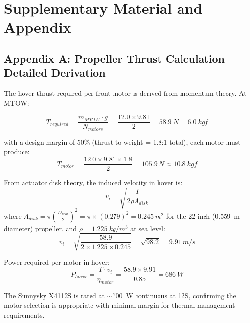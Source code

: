 \chapter{Supplementary Material and Appendix}

\section*{Appendix A: Propeller Thrust Calculation -- Detailed Derivation}

The hover thrust required per front motor is derived from momentum theory. At MTOW:

\begin{equation}
    T_{required} = \frac{m_{MTOW} \cdot g}{N_{motors}} = \frac{12.0 \times 9.81}{2} = \SI{58.9}{N} = \SI{6.0}{kgf}
\end{equation}

\noindent with a design margin of 50\% (thrust-to-weight = 1.8:1 total), each motor must produce:
\begin{equation}
    T_{motor} = \frac{12.0 \times 9.81 \times 1.8}{2} = \SI{105.9}{N} \approx \SI{10.8}{kgf}
\end{equation}

\noindent From actuator disk theory, the induced velocity in hover is:
\begin{equation}
    v_i = \sqrt{\frac{T}{2 \rho A_{disk}}}
\end{equation}
where $A_{disk} = \pi \left(\frac{D_{prop}}{2}\right)^2 = \pi \times (0.279)^2 = \SI{0.245}{m^2}$ for the 22-inch (0.559~m diameter) propeller, and $\rho = \SI{1.225}{kg/m^3}$ at sea level:
\begin{equation}
    v_i = \sqrt{\frac{58.9}{2 \times 1.225 \times 0.245}} = \sqrt{98.2} = \SI{9.91}{m/s}
\end{equation}

\noindent Power required per motor in hover:
\begin{equation}
    P_{hover} = \frac{T \cdot v_i}{\eta_{motor}} = \frac{58.9 \times 9.91}{0.85} = \SI{686}{W}
\end{equation}

\noindent The Sunnysky X4112S is rated at $\sim$700~W continuous at 12S, confirming the motor selection is appropriate with minimal margin for thermal management requirements.

